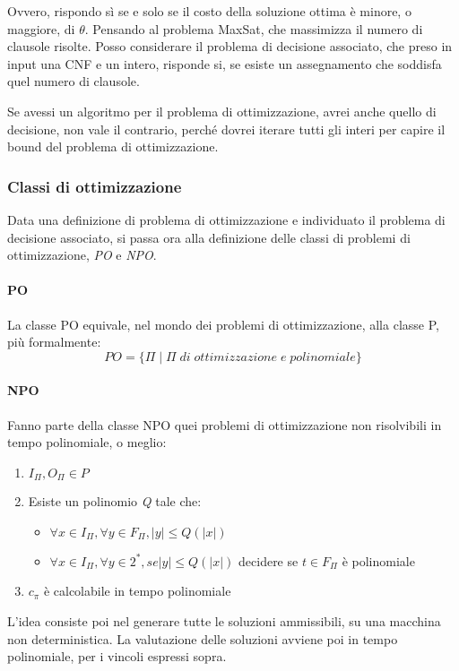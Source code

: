 Ovvero, rispondo sì se e solo se il costo della soluzione ottima è minore, 
o maggiore, di $\theta$.
Pensando al problema MaxSat, che massimizza il numero di clausole risolte. 
Posso considerare il problema di decisione associato, che preso in input 
una CNF e un intero, risponde si, se esiste un assegnamento che soddisfa quel
numero di clausole.

Se avessi un algoritmo per il problema di ottimizzazione, avrei anche quello 
di decisione, non vale il contrario, perché dovrei iterare tutti gli interi
per capire il bound del problema di ottimizzazione.

\subsubsection{Classi di ottimizzazione}
Data una definizione di problema di ottimizzazione e individuato il problema di decisione 
associato, si passa ora alla definizione delle classi di problemi di ottimizzazione, \emph{PO}
e \emph{NPO}.

\paragraph{PO}
La classe PO equivale, nel mondo dei problemi di ottimizzazione, alla classe P,
più formalmente:
$$PO = \{ \Pi\;|\;\Pi\;di\;ottimizzazione\;e\;polinomiale\}$$

\paragraph{NPO}
Fanno parte della classe NPO quei problemi di ottimizzazione non risolvibili 
in tempo polinomiale, o meglio:
\begin{enumerate}
    \item $I_\Pi, O_\Pi \in P$
    \item Esiste un polinomio \emph{Q} tale che:
        \begin{itemize}
            \item $\forall x \in I_\Pi, \forall y \in F_\Pi, |y| \leq Q(|x|)$
            \item $\forall x \in I_\Pi, \forall y \in 2^*, se |y| \leq Q(|x|)$ decidere
            se $t \in F_\Pi$ è polinomiale
        \end{itemize}
    \item $c_\pi$ è calcolabile in tempo polinomiale
\end{enumerate}
L'idea consiste poi nel generare tutte le soluzioni ammissibili, su una macchina 
non deterministica.
La valutazione delle soluzioni avviene poi in tempo polinomiale, per i vincoli espressi
sopra.

